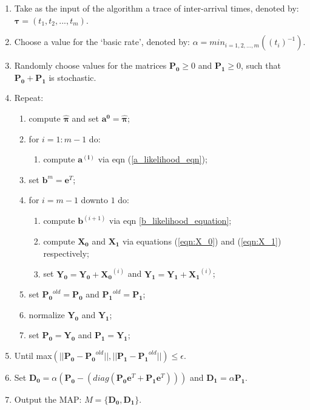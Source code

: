 \documentclass[a4paper,11pt,titlepage]{article}
\begin{document}
\begin{enumerate}
    \item Take as the input of the algorithm a trace of inter-arrival times, denoted by: $\bm{\tau} = (t_1, t_2, ... , t_m)$. 
    \item Choose a value for the `basic rate', denoted by: $\alpha = min_{i=1,2,...,m} ((t_i)^{-1})$.
    \item Randomly choose values for the matrices $\mathbf{P_0} \geq 0$ and $\mathbf{P_1}\geq 0$, such that $\mathbf{P_0} + \mathbf{P_1}$ is stochastic.
    \item Repeat:
    \begin{enumerate}
    \item   compute $\hat{\bm{\pi}}$ and set $\mathbf{a^0} = \hat{\bm{\pi}}$;
    \item   for $i=1:m-1$ do:
    \begin{enumerate}
         \item       compute $\mathbf{a^{(i)}}$ via eqn (\ref{a_likelihood_eqn});
    \end{enumerate}
    \item   set $\mathbf{b}^m = \mathbf{e}^T$;
    \item for $i=m-1$ downto $1$ do:
    \begin{enumerate}
        \item compute $\mathbf{b}^{(i+1)}$ via eqn \ref{b_likelihood_equation};
        \item compute $\mathbf{X_0}$ and $\mathbf{X_1}$ via equations (\ref{eqn:X_0}) and (\ref{eqn:X_1}) respectively;
        \item set $\mathbf{Y_0} = \mathbf{Y_0}+\mathbf{X_0}^{(i)}$ and $\mathbf{Y_1} = \mathbf{Y_1} + \mathbf{X_1}^{(i)}$;
    \end{enumerate}
    \item set $\mathbf{P_0}^{old} = \mathbf{P_0}$ and $\mathbf{P_1}^{old} = \mathbf{P_1}$;
    \item normalize $\mathbf{Y_0}$ and $\mathbf{Y_1}$;
    \item set $\mathbf{P_0} = \mathbf{Y_0}$ and $\mathbf{P_1} = \mathbf{Y_1}$;
    \end{enumerate}
    \item Until max$\left(||\mathbf{P_0}-\mathbf{P_0}^{old}||, ||\mathbf{P_1}-\mathbf{P_1}^{old}||\right) \leq \epsilon$.
    \item Set $\mathbf{D_0} = \alpha \left(\mathbf{P_0} - \left(diag\left(\mathbf{P_0}\mathbf{e}^T + \mathbf{P_1} \mathbf{e}^T\right)\right)\right)$ and $\mathbf{D_1} = \alpha \mathbf{P_1}$.
    \item Output the MAP: $M = \{\mathbf{D_0}, \mathbf{D_1}\}.$
\end{enumerate}
\end{document}
